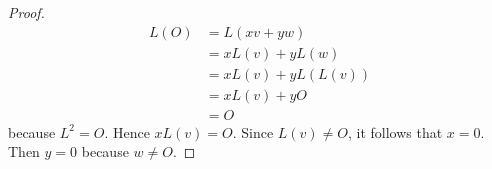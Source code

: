{{\begin{Solution}
\begin{proof}
\begin{equation*}
                \begin{aligned}
                    L(O) &= L(xv +yw) \\
                    &= xL(v) + yL(w) \\
                    &= xL(v) + yL(L(v)) \\
                    &= xL(v) + yO \\
                    &= O
                \end{aligned}
            \end{equation*}
            because $L^2 = O$. 
            Hence $xL(v) = O$. 
            Since $L(v) \neq O$, it follows that $x = 0$. 
            Then $y = 0$ because $w \neq O$. 
        \end{proof}
    \end{Solution}
    \item 
    \item 
}}